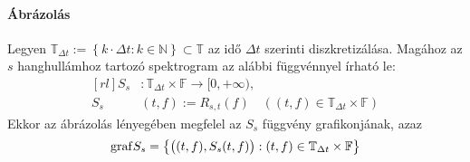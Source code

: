 \paragraph{\'Abr\'azol\'as}
Legyen $\mathbb{T}_{\Delta t}:=\left\{ k\cdot\Delta t : k\in\mathbb{N} \right\} \subset \mathbb{T}$ az id\H o $\Delta t$ szerinti diszkretiz\'al\'asa. \newline
Mag\'ahoz az $s$ hanghull\'amhoz tartoz\'o spektrogram az al\'abbi f\"uggv\'ennyel \'irhat\'o le:
\[ \begin{aligned}[rl]
S_s&:\mathbb{T}_{\Delta t}\times\mathbb{F} \rightarrow [0,+\infty), \\
S_s&(t,f):=R_{s,t}(f) \quad \left( (t,f)\in \mathbb{T}_{\Delta t}\times\mathbb{F} \right)
\end{aligned}
\]
Ekkor az \'abr\'azol\'as l\'enyeg\'eben megfelel az $S_s$ f\"uggv\'eny grafikonj\'anak, azaz
\[
\mathrm{graf} S_s = \left\{ \big( (t,f) ,S_s(t,f) \big) : (t,f)\in \mathbb{T}_{\Delta t}\times\mathbb{F} \right\}
\]

